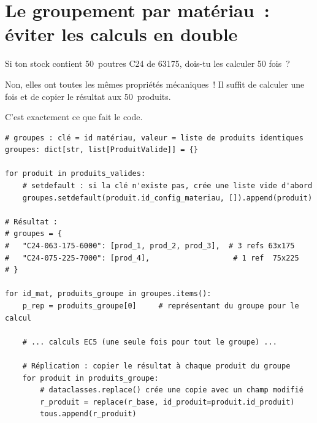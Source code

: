 \section{Le groupement par mat\'eriau~: \'eviter les calculs en double}

\begin{maitre}
Si ton stock contient 50~poutres C24 de 63\texttimes{}175, dois-tu
les calculer 50 fois~?
\end{maitre}

\begin{apprenti}
Non, elles ont toutes les m\^emes propri\'et\'es m\'ecaniques~!
Il suffit de calculer une fois et de copier le r\'esultat aux 50~produits.
\end{apprenti}

\begin{maitre}
C'est exactement ce que fait le code.
\end{maitre}

\begin{lstlisting}[style=python, caption={Groupement par \py{id\_config\_materiau} --- extrait de \fichier{moteur.py}}]
# groupes : clé = id matériau, valeur = liste de produits identiques
groupes: dict[str, list[ProduitValide]] = {}

for produit in produits_valides:
    # setdefault : si la clé n'existe pas, crée une liste vide d'abord
    groupes.setdefault(produit.id_config_materiau, []).append(produit)

# Résultat :
# groupes = {
#   "C24-063-175-6000": [prod_1, prod_2, prod_3],  # 3 refs 63x175
#   "C24-075-225-7000": [prod_4],                   # 1 ref  75x225
# }

for id_mat, produits_groupe in groupes.items():
    p_rep = produits_groupe[0]     # représentant du groupe pour le calcul

    # ... calculs EC5 (une seule fois pour tout le groupe) ...

    # Réplication : copier le résultat à chaque produit du groupe
    for produit in produits_groupe:
        # dataclasses.replace() crée une copie avec un champ modifié
        r_produit = replace(r_base, id_produit=produit.id_produit)
        tous.append(r_produit)
\end{lstlisting}